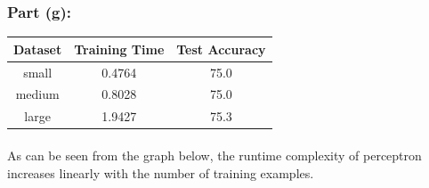 \documentclass[11pt]{article}
\begin{document}
\begin{flushleft}
\subsubsection*{Part (g):}

\begin{center}
	\begin{tabular}{||c c c ||} 
		\hline
		Dataset & Training Time & Test Accuracy \\ [0.5ex] 
		\hline\hline
		small & 0.4764  & 75.0 \\
		\hline
		medium & 0.8028 & 75.0 \\
		\hline
		large & 1.9427 & 75.3 \\
		\hline
	\end{tabular}
\end{center}

\paragraph{}
As can be seen from the graph below, the runtime complexity of perceptron increases linearly with the number of training examples. 



\begin{figure}[H]
	\centering
\end{figure}

\end{flushleft}
\end{document}
